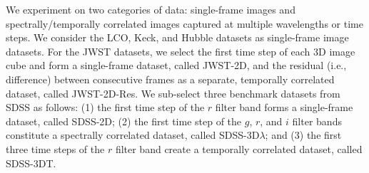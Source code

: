We experiment on two categories of data: single-frame images and spectrally/temporally correlated images captured at multiple wavelengths or time steps. We consider the LCO, Keck, and Hubble datasets as single-frame image datasets. For the JWST datasets, we select the first time step of each 3D image cube and form a single-frame dataset, called JWST-2D, and the residual (i.e., difference) between consecutive frames as a separate, temporally correlated dataset, called JWST-2D-Res.
We sub-select three benchmark datasets from SDSS as follows: (1) the first time step of the $r$ filter band forms a single-frame dataset, called SDSS-2D; (2) the first time step of the $g$, $r$, and $i$ filter bands constitute a spectrally correlated dataset, called SDSS-3D$\lambda$; and (3) the first three time steps of the $r$ filter band create a temporally correlated dataset, called SDSS-3DT.



